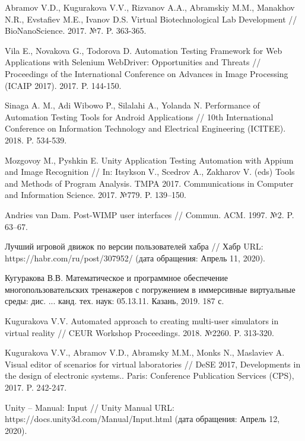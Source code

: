 \nocite{*}
%
%
\begin{thebibliography}{9} 
	
	 Abramov V.D., Kugurakova V.V., Rizvanov A.A., Abramskiy M.M., Manakhov N.R., Evstafiev M.E., Ivanov D.S. Virtual Biotechnological Lab Development // BioNanoScience. 2017. №7. P. 363-365.
	
	 Vila E., Novakova G., Todorova D. Automation Testing Framework for Web Applications with Selenium WebDriver: Opportunities and Threats // Proceedings of the International Conference on Advances in Image Processing (ICAIP 2017). 2017. P. 144-150.
	
	 Sinaga A. M., Adi Wibowo P., Silalahi A., Yolanda N. Performance of Automation Testing Tools for Android Applications // 10th International Conference on Information Technology and Electrical Engineering (ICITEE). 2018. P. 534-539.
	
	 Mozgovoy M., Pyshkin E. Unity Application Testing Automation with Appium and Image Recognition // In: Itsykson V., Scedrov A., Zakharov V. (eds) Tools and Methods of Program Analysis. TMPA 2017. Communications in Computer and Information Science. 2017. №779. P. 139--150.
	
	 Andries van Dam. Post-WIMP user interfaces // Commun. ACM. 1997. №2. P. 63–67.
	
	 Лучший игровой движок по версии пользователей хабра // Хабр URL: https://habr.com/ru/post/307952/ (дата обращения: Апрель 11, 2020).
	
	 Кугуракова В.В. Математическое и программное обеспечение многопользовательских тренажеров с погружением в иммерсивные виртуальные среды: дис. ... канд. тех. наук: 05.13.11. Казань, 2019. 187 с.
	
	 Kugurakova V.V. Automated approach to creating multi-user simulators in virtual reality // CEUR Workshop Proceedings. 2018. №2260. P. 313-320.  
	
	 Kugurakova V.V., Abramov V.D., Abramsky M.M., Monks N., Maslaviev A. Visual editor of scenarios for virtual laboratories // DeSE 2017, Developments in the design of electronic systems.. Paris: Conference Publication Services (CPS), 2017. P. 242-247.
	
	
	 Unity -- Manual: Input // Unity Manual URL: https://docs.unity3d.com/Manual/Input.html (дата обращения: Апрель 12, 2020).
	

\end{thebibliography}
